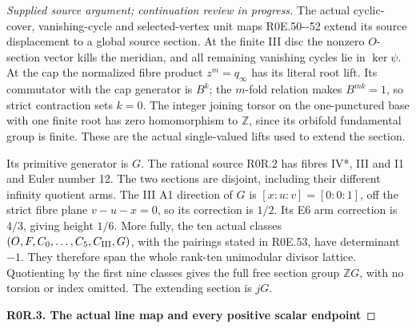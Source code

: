 \begin{proof}[Supplied source argument; continuation review in progress]
The actual cyclic-cover, vanishing-cycle and selected-vertex unit maps
R0E.50-\/-52 extend its source displacement to a global source section.
At the finite III disc the nonzero \(O\)-section vector kills the
meridian, and all remaining vanishing cycles lie in \(\ker\psi\).
At the cap the normalized fibre product \(z^m=q_\infty\) has its
literal root lift. Its commutator with the cap generator is \(B^k\);
the \(m\)-fold relation makes \(B^{mk}=1\), so strict contraction
sets \(k=0\). The integer joining torsor on the one-punctured base
with one finite root has zero homomorphism to \(\mathbb Z\), since
its orbifold fundamental group is finite. These are the actual
single-valued lifts used to extend the section.

Its primitive generator is \(G\). The rational source R0R.2 has
fibres IV*, III and I1 and Euler number 12. The two sections are
disjoint, including their different infinity quotient arms. The
III A1 direction of \(G\) is \([x:u:v]=[0:0:1]\), off the strict
fibre plane \(v-u-x=0\), so its correction is \(1/2\). Its E6
arm correction is \(4/3\), giving height \(1/6\). More fully, the
ten actual classes \((O,F,C_0,\ldots,C_5,C_{\rm III},G)\), with the
pairings stated in R0E.53, have determinant \(-1\). They therefore
span the whole rank-ten unimodular divisor lattice. Quotienting by
the first nine classes gives the full free section group \(\mathbb ZG\),
with no torsion or index omitted. The extending section is \(jG\).

\par

\medskip\noindent\textbf{R0R.3. The actual line map and every positive scalar endpoint}

\par\nobreak


\end{proof}
